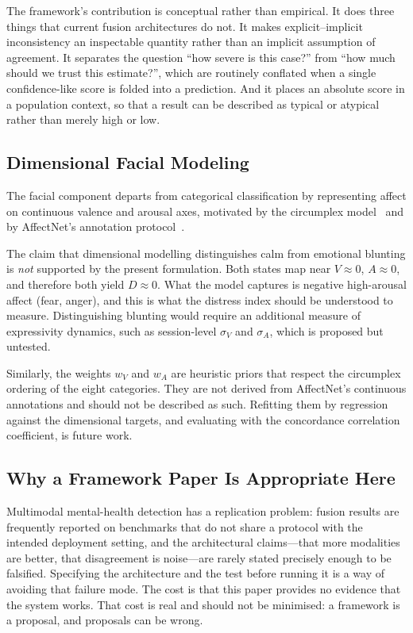 \documentclass[12pt]{article}
\begin{document}
The framework's contribution is conceptual rather than empirical. It
does three things that current fusion architectures do not. It makes
explicit--implicit inconsistency an inspectable quantity rather than an
implicit assumption of agreement. It separates the question ``how
severe is this case?'' from ``how much should we trust this estimate?'',
which are routinely conflated when a single confidence-like score is
folded into a prediction. And it places an absolute score in a
population context, so that a result can be described as typical or
atypical rather than merely high or low.

\subsection{Dimensional Facial Modeling}

The facial component departs from categorical classification by
representing affect on continuous valence and arousal axes, motivated by
the circumplex model~\cite{russell1980circumplex} and by AffectNet's
annotation protocol~\cite{mollahosseini2017affectnet}.

The claim that dimensional modelling distinguishes calm from emotional
blunting is \emph{not} supported by the present formulation. Both
states map near $V \approx 0$, $A \approx 0$, and therefore both yield
$D \approx 0$. What the model captures is negative high-arousal affect
(fear, anger), and this is what the distress index should be understood
to measure. Distinguishing blunting would require an additional measure
of expressivity dynamics, such as session-level $\sigma_V$ and
$\sigma_A$, which is proposed but untested.

Similarly, the weights $w_V$ and $w_A$ are heuristic priors that respect
the circumplex ordering of the eight categories. They are not derived
from AffectNet's continuous annotations and should not be described as
such. Refitting them by regression against the dimensional targets, and
evaluating with the concordance correlation coefficient, is future work.

\subsection{Why a Framework Paper Is Appropriate Here}

Multimodal mental-health detection has a replication problem: fusion
results are frequently reported on benchmarks that do not share a
protocol with the intended deployment setting, and the architectural
claims---that more modalities are better, that disagreement is noise---are
rarely stated precisely enough to be falsified. Specifying the
architecture and the test before running it is a way of avoiding that
failure mode. The cost is that this paper provides no evidence that the
system works. That cost is real and should not be minimised: a framework
is a proposal, and proposals can be wrong.
\end{document}
